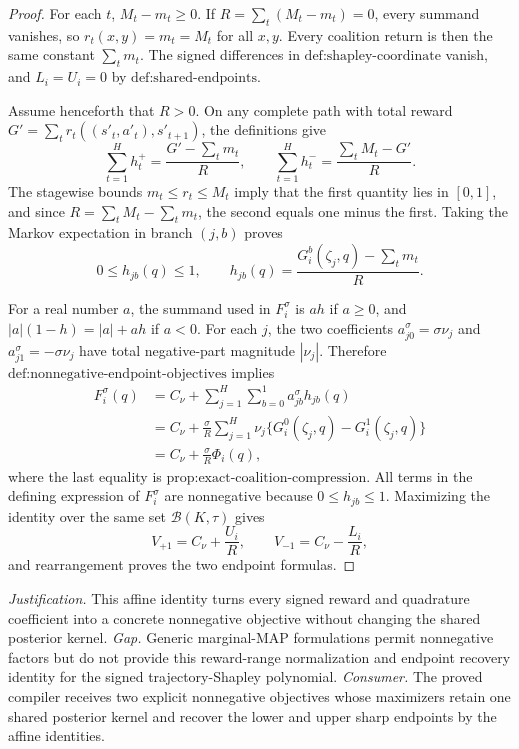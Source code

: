 \documentclass{article}
\begin{document}
\begin{proof}
For each \(t\), \(M_t-m_t\ge0\).  If \(R=\sum_t(M_t-m_t)=0\), every summand vanishes, so \(r_t(x,y)=m_t=M_t\) for all \(x,y\).  Every coalition return is then the same constant \(\sum_tm_t\).  The signed differences in \(\text{def:shapley-coordinate}\) vanish, and \(L_i=U_i=0\) by \(\text{def:shared-endpoints}\).

Assume henceforth that \(R>0\).  On any complete path with total reward \(G'=\sum_tr_t((s'_t,a'_t),s'_{t+1})\), the definitions give
\[
 \sum_{t=1}^Hh_t^+=\frac{G'-\sum_tm_t}{R},\qquad
 \sum_{t=1}^Hh_t^-=\frac{\sum_tM_t-G'}{R}.
\]
The stagewise bounds \(m_t\le r_t\le M_t\) imply that the first quantity lies in \([0,1]\), and since \(R=\sum_tM_t-\sum_tm_t\), the second equals one minus the first.  Taking the Markov expectation in branch \((j,b)\) proves
\[
 0\le h_{jb}(q)\le1,
 \qquad
 h_{jb}(q)=\frac{G_i^b(\zeta_j,q)-\sum_tm_t}{R}.
\]

For a real number \(a\), the summand used in \(F_i^\sigma\) is \(ah\) if \(a\ge0\), and \(|a|(1-h)=|a|+ah\) if \(a<0\).  For each \(j\), the two coefficients \(a_{j0}^\sigma=\sigma\nu_j\) and \(a_{j1}^\sigma=-\sigma\nu_j\) have total negative-part magnitude \(|\nu_j|\).  Therefore \(\text{def:nonnegative-endpoint-objectives}\) implies
\[
\begin{aligned}
 F_i^\sigma(q)
 &=C_\nu+\sum_{j=1}^H\sum_{b=0}^1a_{jb}^\sigma h_{jb}(q)\\
 &=C_\nu+\frac{\sigma}{R}\sum_{j=1}^H\nu_j
       \{G_i^0(\zeta_j,q)-G_i^1(\zeta_j,q)\}\\
 &=C_\nu+\frac{\sigma}{R}\Phi_i(q),
\end{aligned}
\]
where the last equality is \(\text{prop:exact-coalition-compression}\).  All terms in the defining expression of \(F_i^\sigma\) are nonnegative because \(0\le h_{jb}\le1\).  Maximizing the identity over the same set \(\mathcal B(K,\tau)\) gives
\[
 V_{+1}=C_\nu+\frac{U_i}{R},\qquad
 V_{-1}=C_\nu-\frac{L_i}{R},
\]
and rearrangement proves the two endpoint formulas.
\end{proof}
\par\smallskip\noindent \textit{Justification.} This affine identity turns every signed reward and quadrature coefficient into a concrete nonnegative objective without changing the shared posterior kernel. \textit{Gap.} Generic marginal-MAP formulations permit nonnegative factors but do not provide this reward-range normalization and endpoint recovery identity for the signed trajectory-Shapley polynomial. \textit{Consumer.} The proved compiler receives two explicit nonnegative objectives whose maximizers retain one shared posterior kernel and recover the lower and upper sharp endpoints by the affine identities.
\end{document}
